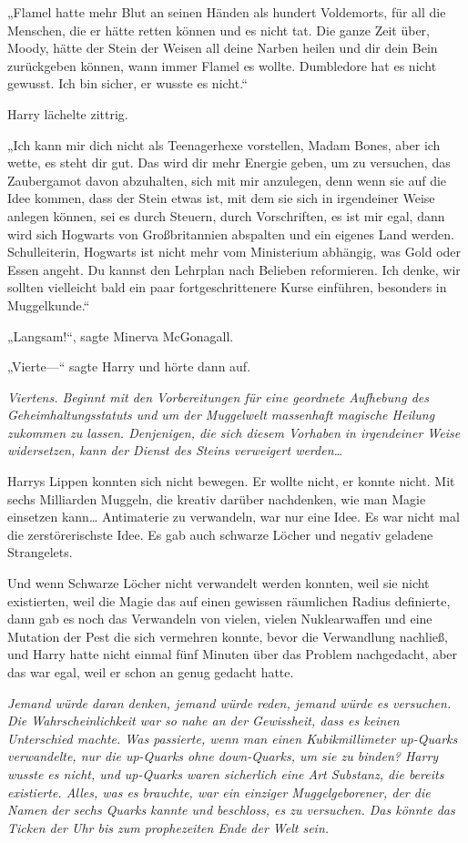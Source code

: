 {„Flamel hatte mehr Blut an seinen Händen als hundert Voldemorts, für all die Menschen, die er hätte retten können und es nicht tat. Die ganze Zeit über, Moody, hätte der Stein der Weisen all deine Narben heilen und dir dein Bein zurückgeben können, wann immer Flamel es wollte. Dumbledore hat es nicht gewusst. Ich bin sicher, er wusste es nicht.“

Harry lächelte zittrig.

„Ich kann mir dich nicht als Teenagerhexe vorstellen, Madam Bones, aber ich wette, es steht dir gut. Das wird dir mehr Energie geben, um zu versuchen, das Zaubergamot davon abzuhalten, sich mit mir anzulegen, denn wenn sie auf die Idee kommen, dass der Stein etwas ist, mit dem sie sich in irgendeiner Weise anlegen können, sei es durch Steuern, durch Vorschriften, es ist mir egal, dann wird sich Hogwarts von Großbritannien abspalten und ein eigenes Land werden. Schulleiterin, Hogwarts ist nicht mehr vom Ministerium abhängig, was Gold oder Essen angeht. Du kannst den Lehrplan nach Belieben reformieren. Ich denke, wir sollten vielleicht bald ein paar fortgeschrittenere Kurse einführen, besonders in Muggelkunde.“

„Langsam!“, sagte Minerva McGonagall.

„Vierte—“ sagte Harry und hörte dann auf.

\emph{Viertens. Beginnt mit den Vorbereitungen für eine geordnete Aufhebung des Geheimhaltungsstatuts und um der Muggelwelt massenhaft magische Heilung zukommen zu lassen. Denjenigen, die sich diesem Vorhaben in irgendeiner Weise widersetzen, kann der Dienst des Steins verweigert werden…}

Harrys Lippen konnten sich nicht bewegen. Er wollte nicht, er konnte nicht. Mit sechs Milliarden Muggeln, die kreativ darüber nachdenken, wie man Magie einsetzen kann… Antimaterie zu verwandeln, war nur eine Idee. Es war nicht mal die zerstörerischste Idee. Es gab auch schwarze Löcher und negativ geladene Strangelets.

Und wenn Schwarze Löcher nicht verwandelt werden konnten, weil sie nicht existierten, weil die Magie das auf einen gewissen räumlichen Radius definierte, dann gab es noch das Verwandeln von vielen, vielen Nuklearwaffen und eine Mutation der Pest die sich vermehren konnte, bevor die Verwandlung nachließ, und Harry hatte nicht einmal fünf Minuten über das Problem nachgedacht, aber das war egal, weil er schon an genug gedacht hatte.

\emph{Jemand würde daran denken, jemand würde reden, jemand würde es versuchen. Die Wahrscheinlichkeit war so nahe an der Gewissheit, dass es keinen Unterschied machte. Was passierte, wenn man einen Kubikmillimeter up-Quarks verwandelte, nur die up-Quarks ohne down-Quarks, um sie zu binden? Harry wusste es nicht, und up-Quarks waren sicherlich eine Art Substanz, die bereits existierte. Alles, was es brauchte, war ein einziger Muggelgeborener, der die Namen der sechs Quarks kannte und beschloss, es zu versuchen. Das könnte das Ticken der Uhr bis zum prophezeiten Ende der Welt sein.}

}
